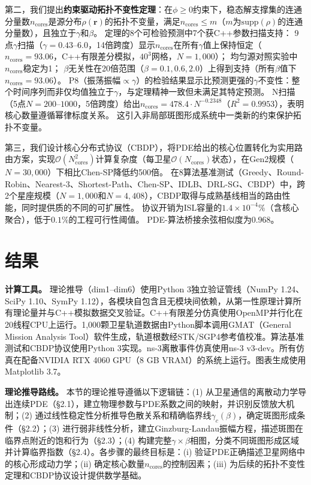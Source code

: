 \documentclass[sn-nature,pdflatex]{sn-jnl}
\begin{document}
第二，我们提出\textbf{约束驱动拓扑不变性定理}：在$\phi \ge 0$约束下，稳态解支撑集的连通分量数$n_{\text{cores}}$是源分布$\rho(\mathbf{r})$的拓扑不变量，满足$n_{\text{cores}} \le m$（$m$为$\text{supp}(\rho)$的连通分量数），且独立于$\gamma$和$\beta$。
定理的8个可检验预测中7个获C++参数扫描支持：
9点$\gamma$扫描（$\gamma=0.43$--$6.0$，14倍跨度）显示$n_{\text{cores}}$在所有$\gamma$值上保持恒定（$n_{\text{cores}} = 93.06$，C++有限差分模拟，$40^3$网格，$N=1,000$）；
均匀源对照实验中$n_{\text{cores}}$稳定为1；
$\beta$无关性在20倍范围（$\beta=0.1, 0.6, 2.0$）上得到支持（所有$\beta$值下$n_{\text{cores}} = 93.06$）。
P8（振荡振幅$\propto \gamma$）的检验结果显示比预测更强的$\gamma$不变性：整个时间序列而非仅均值独立于$\gamma$，与定理精神一致但未满足其特定预测。
N扫描（5点$N=200$--$1000$，5倍跨度）给出$n_{\text{cores}} = 478.4 \cdot N^{-0.2348}$（$R^2=0.9953$），表明核心数量遵循幂律标度关系。
这引入非局部斑图形成系统中一类新的约束保护拓扑不变量。

第三，我们设计核心分布式协议（CBDP），将PDE给出的核心位置转化为实用路由方案，实现$\mathcal{O}(N_{\text{cores}}^2)$计算复杂度（每卫星$\mathcal{O}(N_{\text{cores}})$状态），在Gen2规模（$N=30,000$）下相比Chen-SP降低约500倍。
在8算法基准测试（Greedy、Round-Robin、Nearest-3、Shortest-Path、Chen-SP、IDLB、DRL-SG、CBDP）中，跨2个星座规模（$N=1,000$和$N=4,408$），CBDP取得与成熟基线相当的路由性能，同时提供质的不同的可扩展性。
协议开销为ISL容量的$1.4 \times 10^{-4}\%$（含核心聚合），低于$0.1\%$的工程可行性阈值。
PDE-算法桥接余弦相似度为0.968。

\section{结果}

\textbf{计算工具。} 理论推导（dim1--dim6）使用Python 3独立验证管线（NumPy 1.24、SciPy 1.10、SymPy 1.12），各模块自包含且无模块间依赖，从第一性原理计算所有理论量并与C++模拟数据交叉验证。C++有限差分仿真使用OpenMP并行化在20线程CPU上运行。1,000颗卫星轨道数据由Python脚本调用GMAT（General Mission Analysis Tool）软件生成，轨道根数经STK/SGP4参考值校准。算法基准测试和CBDP协议使用Python 3实现。ns-3离散事件仿真使用ns-3 v3-dev。所有仿真在配备NVIDIA RTX 4060 GPU（8 GB VRAM）的系统上运行。图表生成使用Matplotlib 3.7。

\textbf{理论推导路线。} 本节的理论推导遵循以下逻辑链：(1) 从卫星通信的离散动力学导出连续PDE（§2.1），建立物理参数与PDE系数之间的映射，并识别反馈放大机制；(2) 通过线性稳定性分析推导色散关系和精确临界线$\gamma_c(\beta)$，确定斑图形成条件（§2.2）；(3) 进行弱非线性分析，建立Ginzburg-Landau振幅方程，描述斑图在临界点附近的饱和行为（§2.3）；(4) 构建完整$\gamma\times\beta$相图，分类不同斑图形成区域并计算临界指数（§2.4）。各步骤的最终目标是：(i) 验证PDE正确描述卫星网络中的核心形成动力学；(ii) 确定核心数量$n_{\text{cores}}$的控制因素；(iii) 为后续的拓扑不变性定理和CBDP协议设计提供数学基础。
\end{document}
